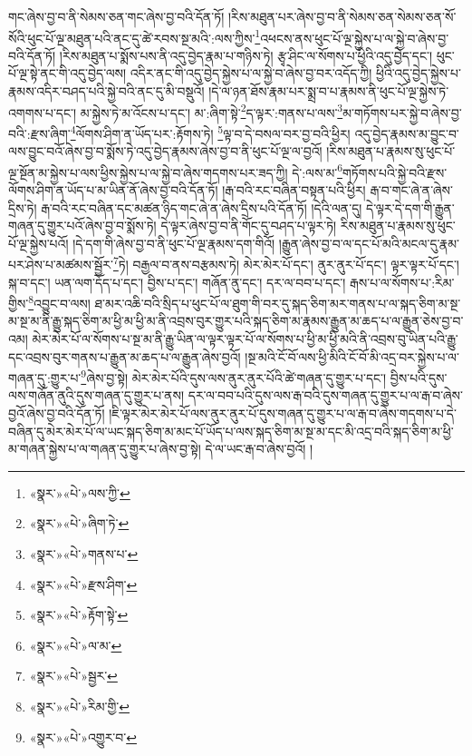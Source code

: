 གང་ཞེས་བྱ་བ་ནི་སེམས་ཅན་གང་ཞེས་བྱ་བའི་དོན་ཏོ། །རིས་མཐུན་པར་ཞེས་བྱ་བ་ནི་སེམས་ཅན་སེམས་ཅན་སོ་སོའི་ཕུང་པོ་ལྔ་མཐུན་པའི་ནང་དུ་ཚེ་རབས་སྔ་མའི་:ལས་ཀྱིས་\footnote{«སྣར་»«པེ་»ལས་ཀྱི་}འཕངས་ནས་ཕུང་པོ་ལྔ་སྐྱེས་པ་ལ་སྐྱེ་བ་ཞེས་བྱ་བའི་དོན་ཏོ། །རིས་མཐུན་པ་སྨོས་པས་ནི་འདུ་བྱེད་རྣམ་པ་གཉིས་ཏེ། རྩྭ་ཤིང་ལ་སོགས་པ་ཕྱིའི་འདུ་བྱེད་དང་། ཕུང་པོ་ལྔ་སྟེ་ནང་གི་འདུ་བྱེད་ལས། འདིར་ནང་གི་འདུ་བྱེད་སྐྱེས་པ་ལ་སྐྱེ་བ་ཞེས་བྱ་བར་འདོད་ཀྱི། ཕྱིའི་འདུ་བྱེད་སྐྱེས་པ་རྣམས་འདིར་བཤད་པའི་སྐྱེ་བའི་ནང་དུ་མི་བསྡུའོ། །དེ་ལ་ཉན་ཐོས་རྣམ་པར་སྨྲ་བ་པ་རྣམས་ནི་ཕུང་པོ་ལྔ་སྐྱེས་ཏེ་འགགས་པ་དང་། མ་སྐྱེས་ཏེ་མ་འོངས་པ་དང་། མ་:ཞིག་སྟེ་\footnote{«སྣར་»«པེ་»ཞིག་ཏེ་}ད་ལྟར་:གནས་པ་ལས་\footnote{«སྣར་»«པེ་»གནས་པ་}མ་གཏོགས་པར་སྐྱེ་བ་ཞེས་བྱ་བའི་:རྫས་ཞིག་\footnote{«སྣར་»«པེ་»རྫས་ཤིག་}ལོགས་ཤིག་ན་ཡོད་པར་:རྟོགས་ཏེ། \footnote{«སྣར་»«པེ་»རྟོག་སྟེ་}ལྟ་བ་དེ་བསལ་བར་བྱ་བའི་ཕྱིར། འདུ་བྱེད་རྣམས་མ་བྱུང་བ་ལས་བྱུང་བའོ་ཞེས་བྱ་བ་སྨོས་ཏེ་འདུ་བྱེད་རྣམས་ཞེས་བྱ་བ་ནི་ཕུང་པོ་ལྔ་ལ་བྱའོ། །རིས་མཐུན་པ་རྣམས་སུ་ཕུང་པོ་ལྔ་སྔོན་མ་སྐྱེས་པ་ལས་ཕྱིས་སྐྱེས་པ་ལ་སྐྱེ་བ་ཞེས་གདགས་པར་ཟད་ཀྱི། དེ་:ལས་མ་\footnote{«སྣར་»«པེ་»ལ་མ་}གཏོགས་པའི་སྐྱེ་བའི་རྫས་ལོགས་ཤིག་ན་ཡོད་པ་མ་ཡིན་ནོ་ཞེས་བྱ་བའི་དོན་ཏོ། །རྒ་བའི་རང་བཞིན་བསྟན་པའི་ཕྱིར། རྒ་བ་གང་ཞེ་ན་ཞེས་དྲིས་ཏེ། རྒ་བའི་རང་བཞིན་དང་མཚན་ཉིད་གང་ཞེ་ན་ཞེས་དྲིས་པའི་དོན་ཏོ། །དེའི་ལན་དུ། དེ་ལྟར་དེ་དག་གི་རྒྱུན་གཞན་དུ་གྱུར་པའོ་ཞེས་བྱ་བ་སྨོས་ཏེ། དེ་ལྟར་ཞེས་བྱ་བ་ནི་གོང་དུ་བཤད་པ་ལྟར་ཏེ། རིས་མཐུན་པ་རྣམས་སུ་ཕུང་པོ་ལྔ་སྐྱེས་པའོ། །དེ་དག་གི་ཞེས་བྱ་བ་ནི་ཕུང་པོ་ལྔ་རྣམས་དག་གིའོ། །རྒྱུན་ཞེས་བྱ་བ་ལ་དང་པོ་མའི་མངལ་དུ་རྣམ་པར་ཤེས་པ་མཚམས་སྦྱོར་\footnote{«སྣར་»«པེ་»སྦྱར་}ཏེ། བརྒྱལ་བ་ནས་བརྩམས་ཏེ། མེར་མེར་པོ་དང་། ནུར་ནུར་པོ་དང་། ལྟར་ལྟར་པོ་དང་། སྐ་བ་དང་། ཡན་ལག་དོད་པ་དང་། བྱིས་པ་དང་། གཞོན་ནུ་དང་། དར་ལ་བབ་པ་དང་། རྒས་པ་ལ་སོགས་པ་:རིམ་གྱིས་\footnote{«སྣར་»«པེ་»རིམ་གྱི་}འབྱུང་བ་ལས། ཐ་མར་འཆི་བའི་སྲིད་པ་ཕུང་པོ་ལ་ཐུག་གི་བར་དུ་སྐད་ཅིག་མར་གནས་པ་ལ་སྐད་ཅིག་མ་སྔ་མ་སྔ་མ་ནི་རྒྱུ་སྐད་ཅིག་མ་ཕྱི་མ་ཕྱི་མ་ནི་འབྲས་བུར་གྱུར་པའི་སྐད་ཅིག་མ་རྣམས་རྒྱུན་མ་ཆད་པ་ལ་རྒྱུན་ཅེས་བྱ་བ་འམ། མེར་མེར་པོ་ལ་སོགས་པ་སྔ་མ་ནི་རྒྱུ་ཡིན་ལ་ལྟར་ལྟར་པོ་ལ་སོགས་པ་ཕྱི་མ་ཕྱི་མའི་ནི་འབྲས་བུ་ཡིན་པའི་རྒྱུ་དང་འབྲས་བུར་གནས་པ་རྒྱུན་མ་ཆད་པ་ལ་རྒྱུན་ཞེས་བྱའོ། །སྔ་མའི་ངོ་བོ་ལས་ཕྱི་མིའི་ངོ་བོ་མི་འདྲ་བར་སྐྱེས་པ་ལ་གཞན་དུ་:གྱུར་པ་\footnote{«སྣར་»«པེ་»འགྱུར་བ་}ཞེས་བྱ་སྟེ། མེར་མེར་པོའི་དུས་ལས་ནུར་ནུར་པོའི་ཚེ་གཞན་དུ་གྱུར་པ་དང་། བྱིས་པའི་དུས་ལས་གཞོན་ནུའི་དུས་གཞན་དུ་གྱུར་པ་ནས། དར་ལ་བབ་པའི་དུས་ལས་རྒ་བའི་དུས་གཞན་དུ་གྱུར་པ་ལ་རྒ་བ་ཞེས་བྱའོ་ཞེས་བྱ་བའི་དོན་ཏོ། །ཇི་ལྟར་མེར་མེར་པོ་ལས་ནུར་ནུར་པོ་དུས་གཞན་དུ་གྱུར་པ་ལ་རྒ་བ་ཞེས་གདགས་པ་དེ་བཞིན་དུ་མེར་མེར་པོ་ལ་ཡང་སྐད་ཅིག་མ་མང་པོ་ཡོད་པ་ལས་སྐད་ཅིག་མ་སྔ་མ་དང་མི་འདྲ་བའི་སྐད་ཅིག་མ་ཕྱི་མ་གཞན་སྐྱེས་པ་ལ་གཞན་དུ་གྱུར་པ་ཞེས་བྱ་སྟེ། དེ་ལ་ཡང་རྒ་བ་ཞེས་བྱའོ། །
